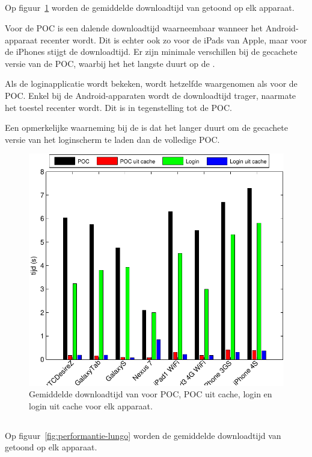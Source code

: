 \subsection{\jqm}
Op figuur~\ref{fig:performantie-jqm} worden de gemiddelde downloadtijd van \jqm{} getoond op elk apparaat.

Voor de POC is een dalende downloadtijd waarneembaar wanneer het Android-apparaat recenter wordt.
Dit is echter ook zo voor de iPads van Apple, maar voor de iPhones stijgt de downloadtijd.
Er zijn minimale verschillen bij de gecachete versie van de POC, waarbij het het langste duurt op de \ipadi{}.

Als de loginapplicatie wordt bekeken, wordt hetzelfde waargenomen als voor de POC.
Enkel bij de Android-apparaten wordt de downloadtijd trager, naarmate het toestel recenter wordt.
Dit is in tegenstelling tot de POC.

Een opmerkelijke waarneming bij de \nexus{} is dat het langer duurt om de gecachete versie van het loginscherm te laden dan de volledige POC.

\begin{figure}[H]
  \centering
  \includegraphics[width=\textwidth]{figuren/performance-jquery.pdf}
  \caption{Gemiddelde downloadtijd van \jqm{} voor POC,  POC uit cache, login en login uit cache voor elk apparaat.}
  \label{fig:performantie-jqm}
\end{figure}

\subsection{\lungo}
Op figuur~\ref{fig:performantie-lungo} worden de gemiddelde downloadtijd van \lungo{} getoond op elk apparaat.

